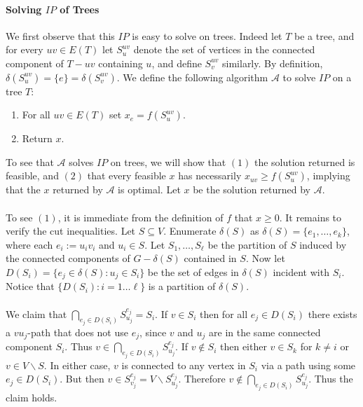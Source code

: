 \documentclass[letterpaper,12pt,oneside,onecolumn]{article}
\newcommand{\cA}{\mathcal{A}} \newcommand{\cB}{\mathcal{B}}
\begin{document}
\paragraph{Solving $IP$ of Trees}
We first observe that this $IP$ is easy to solve on trees. Indeed let $T$ be a tree, and for every $uv \in E(T)$ let $S^{uv}_u$ denote the set of vertices in the connected component of $T-uv$ containing $u$, and define $S^{uv}_v$ similarly. By definition, $\delta(S^{uv}_u) =  \{e\} = \delta(S^{uv}_v)$. We define the following algorithm $\cA$ to solve $IP$ on a tree $T$:
\begin{enumerate}
\item For all $uv \in E(T)$ set $x_e = f(S^{uv}_u)$.
\item Return $x$.
\end{enumerate}
To see that $\cA$ solves $IP$ on trees, we will show that $(1)$ the solution returned is feasible, and $(2)$ that every feasible $x$ has necessarily $x_{uv} \geq f(S^{uv}_u)$, implying that the $x$ returned by $\cA$ is optimal.  Let $x$ be the solution returned by $\cA$. 
\paragraph{}
To see $(1)$, it is immediate from the definition of $f$ that $x \geq 0$. It remains to verify the cut inequalities. Let $S \subseteq V$. Enumerate $\delta(S)$ as $\delta(S) = \{e_1, \dots, e_k \}$, where each $e_i := u_iv_i$ and $u_i \in S$. Let $S_1, \dots, S_\ell$ be the partition of $S$ induced by the connected components of $G-\delta(S)$ contained in $S$.  Now let $D(S_i) = \{ e_j \in \delta(S) : u_j \in S_i \}$ be the set of edges in $\delta(S)$ incident with $S_i$. Notice that $\{D(S_i): i = 1\dots \ell\}$ is a partition of $\delta(S)$. 
\paragraph{}
We claim that $\bigcap_{e_j \in D(S_i)} S^{e_j}_{u_j} = S_i.$ If $v \in S_i$ then for all $e_j \in D(S_i)$ there exists a $vu_j$-path that does not use $e_j$, since $v$ and $u_j$ are in the same connected component $S_i$. Thus $v \in \bigcap_{e_j \in D(S_i)}S^{e_j}_{u_j}$. If $v \not\in S_i$ then either $v \in S_{k}$ for $k \neq i$ or $v \in V\backslash S$. In either case, $v$ is connected to any vertex in $S_i$ via a path using some $e_j \in D(S_i)$. But then $v \in S^{e_j}_{v_j} = V \backslash S^{e_j}_{u_j}$. Therefore $v \not\in \bigcap_{e_j \in D(S_i)}S^{e_j}_{u_j}$. Thus the claim holds.
\end{document}
